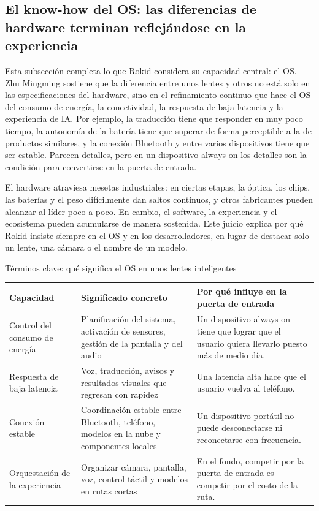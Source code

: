 \documentclass[a4paper]{article}
\begin{document}
\subsection{El know-how del OS: las diferencias de hardware terminan reflejándose en la experiencia}

Esta subsección completa lo que Rokid considera su capacidad central: el OS. Zhu Mingming sostiene que la diferencia entre unos lentes y otros no está solo en las especificaciones del hardware, sino en el refinamiento continuo que hace el OS del consumo de energía, la conectividad, la respuesta de baja latencia y la experiencia de IA. Por ejemplo, la traducción tiene que responder en muy poco tiempo, la autonomía de la batería tiene que superar de forma perceptible a la de productos similares, y la conexión Bluetooth y entre varios dispositivos tiene que ser estable. Parecen detalles, pero en un dispositivo always-on los detalles son la condición para convertirse en la puerta de entrada.

El hardware atraviesa mesetas industriales: en ciertas etapas, la óptica, los chips, las baterías y el peso difícilmente dan saltos continuos, y otros fabricantes pueden alcanzar al líder poco a poco. En cambio, el software, la experiencia y el ecosistema pueden acumularse de manera sostenida. Este juicio explica por qué Rokid insiste siempre en el OS y en los desarrolladores, en lugar de destacar solo un lente, una cámara o el nombre de un modelo.

\begin{knowledgebox}{Términos clave: qué significa el OS en unos lentes inteligentes}
\noindent\begin{tabularx}{\textwidth}{p{}p{}X}
\toprule
Capacidad & Significado concreto & Por qué influye en la puerta de entrada \\
\midrule
Control del consumo de energía & Planificación del sistema, activación de sensores, gestión de la pantalla y del audio & Un dispositivo always-on tiene que lograr que el usuario quiera llevarlo puesto más de medio día. \\
Respuesta de baja latencia & Voz, traducción, avisos y resultados visuales que regresan con rapidez & Una latencia alta hace que el usuario vuelva al teléfono. \\
Conexión estable & Coordinación estable entre Bluetooth, teléfono, modelos en la nube y componentes locales & Un dispositivo portátil no puede desconectarse ni reconectarse con frecuencia. \\
Orquestación de la experiencia & Organizar cámara, pantalla, voz, control táctil y modelos en rutas cortas & En el fondo, competir por la puerta de entrada es competir por el costo de la ruta. \\
\bottomrule
\end{tabularx}
\end{knowledgebox}
\end{document}
